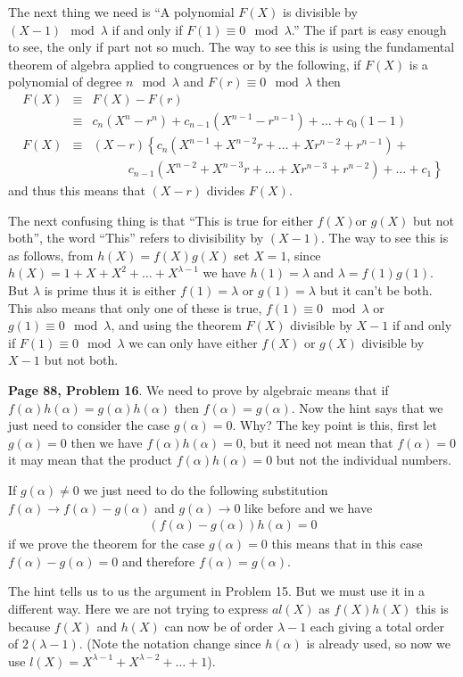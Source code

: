 \documentclass[aps,preprint,preprintnumbers,nofootinbib,showpacs,prd]{revtex4-1}
\newcommand{\nbea}{\begin{eqnarray*}}
\newcommand{\neea}{\end{eqnarray*}}
\begin{document}
The next thing we need is ``A polynomial $F(X)$ is divisible by $(X-1) \mod{\lambda}$ if and only if $F(1) \equiv 0\mod{\lambda}$.'' The if part is easy enough to see, the only if part not so much. The way to see this is using the fundamental theorem of algebra applied to congruences or by the following, if $F(X)$ is a polynomial of degree $n \mod{\lambda}$ and $F(r) \equiv 0 \mod{\lambda}$ then
%
\nbea
F(X) & \equiv & F(X) - F(r) \\
& \equiv & c_n (X^n - r^n) + c_{n-1}(X^{n-1} - r^{n-1}) + \dots + c_0(1 - 1) \\
F(X) & \equiv & (X - r) \left \{c_n(X^{n-1} + X^{n-2}r + \dots + X r^{n-2} + r^{n-1}) + \right .\\
& & \left.~~~~~~~~~~~~~ c_{n-1}(X^{n-2} + X^{n-3}r + \dots + X r^{n-3} + r^{n-2}) + \dots + c_1 \right \}
\neea
%
and thus this means that $(X - r)$ divides $F(X)$.

The next confusing thing is that ``This is true for either $f(X)$or $g(X)$ but not both'', the word ``This'' refers to divisibility by $(X-1)$. The way to see this is as follows, from $h(X) = f(X)g(X)$ set $X = 1$, since $h(X) = 1 + X + X^2 + \dots + X^{\lambda - 1}$ we have $h(1) = \lambda$ and $\lambda = f(1)g(1)$. But $\lambda$ is prime thus it is either $f(1) = \lambda$ or $g(1) = \lambda$ but it can't be both. This also means that only one of these is true, $f(1) \equiv 0 \mod{\lambda}$ or $g(1) \equiv 0 \mod{\lambda}$, and using the theorem $F(X)$  divisible by $X-1$ if and only if $F(1) \equiv 0\mod{\lambda}$ we can only have either $f(X)$ or $g(X)$ divisible by $X - 1$ but not both.

{\bf Page 88, Problem 16}. We need to prove by algebraic means that if $f(\alpha)h(\alpha) = g(\alpha)h(\alpha)$ then $f(\alpha) = g(\alpha)$. Now the hint says that we just need to consider the case $g(\alpha) = 0$. Why? The key point is this, first let $g(\alpha) = 0$ then we have $f(\alpha)h(\alpha) = 0$, but it need not mean that $f(\alpha) = 0$ it may mean that the product $f(\alpha)h(\alpha) = 0$ but not the individual numbers.

If $g(\alpha) \neq 0$ we just need to do the following substitution $f(\alpha) \to f(\alpha) - g(\alpha)$ and $g(\alpha) \to 0$ like before and we have
%
\nbea
(f(\alpha) - g(\alpha))h(\alpha) = 0
\neea
%
if we prove the theorem for the case $g(\alpha) = 0$ this means that in this case $f(\alpha) - g(\alpha) = 0$ and therefore $f(\alpha) = g(\alpha)$.

The hint tells us to us the argument in Problem 15. But we must use it in a different way. Here we are not trying to express $al(X)$ as $f(X)h(X)$ this is because $f(X)$ and $h(X)$ can now be of order $\lambda - 1$ each giving a total order of $2(\lambda - 1)$. (Note the notation change since $h(\alpha)$ is already used, so now we use $l(X) = X^{\lambda-1} + X^{\lambda - 2} + \dots + 1$).
\end{document}
